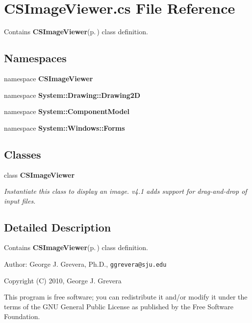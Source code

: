\section{CSImage\-Viewer.cs File Reference}
\label{_c_s_image_viewer_8cs}
Contains {\bf CSImage\-Viewer}{\rm (p.\,\pageref{namespace_c_s_image_viewer})} class definition. 

\subsection*{Namespaces}
\begin{CompactItemize}
\item 
namespace {\bf CSImage\-Viewer}
\item 
namespace {\bf System::Drawing::Drawing2D}
\item 
namespace {\bf System::Component\-Model}
\item 
namespace {\bf System::Windows::Forms}
\end{CompactItemize}
\subsection*{Classes}
\begin{CompactItemize}
\item 
class {\bf CSImage\-Viewer}
\begin{CompactList}\small\item\em Instantiate this class to display an image. v4.1 adds support for drag-and-drop of input files. \item\end{CompactList}\end{CompactItemize}


\subsection{Detailed Description}
Contains {\bf CSImage\-Viewer}{\rm (p.\,\pageref{namespace_c_s_image_viewer})} class definition. 

\begin{Desc}
\item[Author:]George J. Grevera, Ph.D., {\tt ggrevera@sju.edu}\end{Desc}
Copyright (C) 2010, George J. Grevera

This program is free software; you can redistribute it and/or modify it under the terms of the GNU General Public License as published by the Free Software Foundation.

